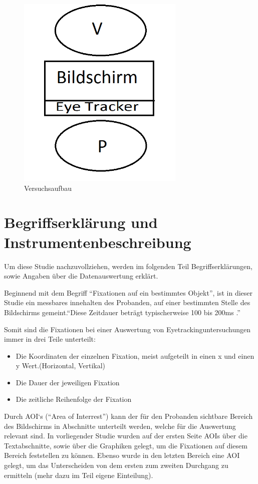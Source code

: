 \begin{figure}[!ht]
\noindent\hspace{0.5mm}\includegraphics[width=8cm]{./Ressourcen/Versuchsaufbau.png}
\caption{Versuchsaufbau}
\end{figure}

\section{Begriffserklärung und Instrumentenbeschreibung}
Um diese Studie nachzuvollziehen, werden im folgenden Teil Begriffserklärungen, sowie Angaben über die Datenauswertung erklärt.


Beginnend mit dem Begriff ``Fixationen auf ein bestimmtes Objekt'', ist in dieser Studie ein messbares innehalten des Probanden, auf einer bestimmten Stelle des Bildschirms gemeint.``Diese Zeitdauer beträgt typischerweise 100 bis 200ms\cite{EyetrackingFixation} .''

Somit sind die Fixationen bei einer Auswertung von Eyetrackinguntersuchungen immer in drei Teile unterteilt:
    \begin{itemize}
        \item Die Koordinaten der einzelnen Fixation, meist aufgeteilt in einen x und einen y Wert.(Horizontal, Vertikal)
        \item Die Dauer der jeweiligen Fixation
        \item Die zeitliche Reihenfolge der Fixation
    \end{itemize}


Durch AOI`s (``Area of Interrest'') kann der für den Probanden sichtbare Bereich des Bildschirms in Abschnitte unterteilt werden, welche für die Auswertung relevant sind. In vorliegender Studie wurden auf der ersten Seite AOIs über die Textabschnitte, sowie über die Graphiken gelegt, um die Fixationen auf diesem Bereich feststellen zu können. Ebenso wurde in den letzten Bereich eine AOI gelegt, um das Unterscheiden von dem ersten zum zweiten Durchgang zu ermitteln (mehr dazu im Teil eigene Einteilung).

